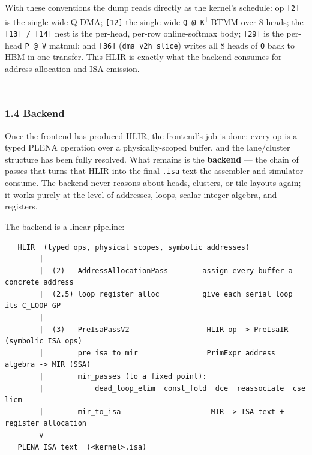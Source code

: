 \documentclass[
  10pt,
]{article}
\begin{document}
With these conventions the dump reads directly as the kernel's schedule:
op \texttt{[2]} is the single wide Q DMA; \texttt{[12]} the single wide
\texttt{Q\,@\,K\textsuperscript{T}} BTMM over 8 heads; the
\texttt{[13]\,/\,[14]} nest is the per-head, per-row online-softmax body;
\texttt{[29]} is the per-head \texttt{P\,@\,V} matmul; and \texttt{[36]}
(\texttt{dma\_v2h\_slice}) writes all 8 heads of \texttt{O} back to HBM in
one transfer. This HLIR is exactly what the backend consumes for address
allocation and ISA emission.

\begin{center}\rule{0.5\linewidth}{0.5pt}\end{center}

\begin{center}\rule{0.5\linewidth}{0.5pt}\end{center}

\subsubsection{1.4 Backend}\label{isa-compiler-backend}

Once the frontend has produced HLIR, the frontend's job is done: every
op is a typed PLENA operation over a physically-scoped buffer, and the
lane/cluster structure has been fully resolved. What remains is the
\textbf{backend} --- the chain of passes that turns that HLIR into the
final \texttt{.isa} text the assembler and simulator consume. The
backend never reasons about heads, clusters, or tile layouts again; it
works purely at the level of addresses, loops, scalar integer algebra,
and registers.

The backend is a linear pipeline:

\begin{verbatim}
   HLIR  (typed ops, physical scopes, symbolic addresses)
        |
        |  (2)   AddressAllocationPass        assign every buffer a concrete address
        |  (2.5) loop_register_alloc          give each serial loop its C_LOOP GP
        |
        |  (3)   PreIsaPassV2                  HLIR op -> PreIsaIR (symbolic ISA ops)
        |        pre_isa_to_mir                PrimExpr address algebra -> MIR (SSA)
        |        mir_passes (to a fixed point):
        |            dead_loop_elim  const_fold  dce  reassociate  cse  licm
        |        mir_to_isa                     MIR -> ISA text + register allocation
        v
   PLENA ISA text  (<kernel>.isa)
\end{verbatim}
\end{document}
